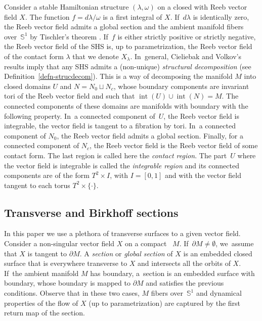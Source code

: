 Consider a stable Hamiltonian structure $(\lambda,\omega)$ on a closed \threemanifold with Reeb vector field $X$. The function $f=d\lambda/\omega$ is a first integral of $X$. If~$d\lambda$ is identically zero, the Reeb vector field admits a global section and the ambient manifold fibers over~$\mathbb{S}^1$ by Tischler's theorem \cite{Tis}. If~$f$ is either strictly positive or strictly negative, the Reeb vector field of the SHS is, up to parametrization, the Reeb vector field of the contact form $\lambda$ that we denote $X_\lambda$. In~general, Cieliebak and Volkov's results \cite{CV1} imply that any SHS admits a (non-unique) \emph{structural decomposition} (see Definition~\ref{defn-strucdecom}). This is a way of decomposing the manifold $M$ into closed domains $U$ and $N=N_0\sqcup N_c$, whose boundary components are invariant tori of the Reeb vector field and such that $\operatorname{int}(U)\cup \operatorname{int}(N)=M$. The connected components of these domains are manifolds with boundary with the following property. In~a connected component of~$U$, the Reeb vector field is integrable, \ie the vector field is tangent to a fibration by tori. In~a connected component of $N_0$, the Reeb vector field admits a global section. Finally, for a connected component of $N_c$, the Reeb vector field is the Reeb vector field of some contact form. The last region is called here the \textit{contact region}. The part~$U$ where the vector field is integrable is called the \textit{integrable region} and its connected components are of the form $T^2\times I$, with $I=[0,1]$ and with the vector field tangent to each torus $T^2\times \{\cdot \}$.

\subsection{Transverse and Birkhoff sections} In this paper we use a plethora of transverse surfaces to a given vector field. Consider a non-singular vector field $X$ on a compact \threemanifold~$M$. If~$\partial M\neq \emptyset$, we~assume that $X$ is tangent to $\partial M$. A \emph{section} or \emph{global section} of $X$ is an embedded closed surface that is everywhere transverse to $X$ and intersects all the orbits of $X$. If~the ambient manifold $M$ has boundary, a~section is an embedded surface with boundary, whose boundary is mapped to $\partial M$ and satisfies the previous conditions. Observe that in these two cases, $M$ fibers over~$\mathbb{S}^1$ and dynamical properties of the flow of $X$ (up to parametrization) are captured by the first return map of the section.

